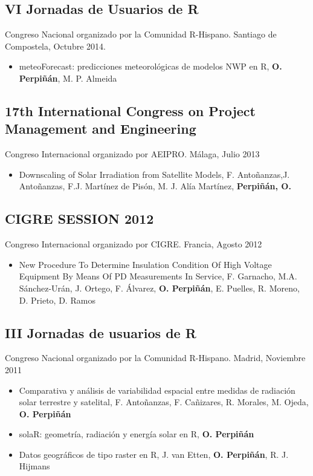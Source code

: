 \documentclass[article, a4paper]{memoir}
\begin{document}
\subsection{VI Jornadas de Usuarios de R}
\label{sec-9-2}
Congreso Nacional organizado por la Comunidad R-Hispano. Santiago de Compostela, Octubre 2014. 

\begin{itemize}
\item meteoForecast: predicciones meteorológicas de modelos NWP en R, \textbf{O. Perpiñán}, M. P. Almeida
\end{itemize}

\subsection{17th International Congress on  Project Management and Engineering}
\label{sec-9-3}
Congreso Internacional organizado por AEIPRO. Málaga, Julio 2013

\begin{itemize}
\item Downscaling of Solar Irradiation from Satellite Models, F. Antoñanzas,J. Antoñanzas, F.J. Martínez de Pisón, M. J. Alía Martínez, \textbf{Perpiñán, O.}
\end{itemize}
\subsection{CIGRE SESSION 2012}
\label{sec-9-4}
Congreso Internacional organizado por CIGRE. Francia, Agosto 2012

\begin{itemize}
\item New Procedure To Determine Insulation Condition Of High Voltage Equipment By Means Of PD Measurements In Service, F. Garnacho, M.A. Sánchez-Urán, J. Ortego, F. Álvarez, \textbf{O. Perpiñán}, E. Puelles, R. Moreno, D. Prieto, D. Ramos
\end{itemize}

\subsection{III Jornadas de usuarios de R}
\label{sec-9-5}
Congreso Nacional organizado por la Comunidad R-Hispano. Madrid, Noviembre 2011

\begin{itemize}
\item Comparativa y análisis de variabilidad espacial entre medidas de radiación solar terrestre y satelital, F. Antoñanzas, F. Cañizares, R. Morales, M. Ojeda, \textbf{O. Perpiñán}

\item solaR: geometría, radiación y energía solar en R, \textbf{O. Perpiñán}

\item Datos geográficos de tipo raster en R, J. van Etten, \textbf{O. Perpiñán}, R. J. Hijmans
\end{itemize}
\end{document}
